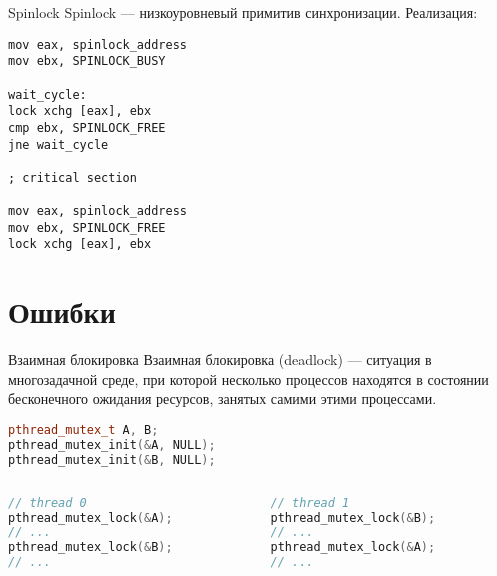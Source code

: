 \begin{frame}[fragile]{Spinlock}
Spinlock --- низкоуровневый примитив синхронизации.
\vfill
Реализация:
\begin{lstlisting}[language={[x86masm]Assembler}, basicstyle=\scriptsize]
mov eax, spinlock_address
mov ebx, SPINLOCK_BUSY

wait_cycle:
lock xchg [eax], ebx
cmp ebx, SPINLOCK_FREE
jne wait_cycle

; critical section

mov eax, spinlock_address
mov ebx, SPINLOCK_FREE
lock xchg [eax], ebx
\end{lstlisting}
\end{frame}

\section{Ошибки}

\begin{frame}[fragile]{Взаимная блокировка}
Взаимная блокировка (\abbr deadlock) --- ситуация в многозадачной среде, при которой несколько процессов находятся в состоянии бесконечного ожидания ресурсов, занятых самими этими процессами.
\vfill
\begin{lstlisting}[language=C++,basicstyle=\ttfamily,keywordstyle=\color{blue},basicstyle=\footnotesize]
pthread_mutex_t A, B;
pthread_mutex_init(&A, NULL);
pthread_mutex_init(&B, NULL);
\end{lstlisting}

\begin{columns}[t]
    \begin{column}[T]{0.45\textwidth}
        \begin{lstlisting}[language=C++,basicstyle=\ttfamily,keywordstyle=\color{blue},basicstyle=\scriptsize]
// thread 0
pthread_mutex_lock(&A);
// ...
pthread_mutex_lock(&B);
// ...
        \end{lstlisting}
    \end{column}
    \begin{column}[T]{0.45\textwidth}
        \begin{lstlisting}[language=C++,basicstyle=\ttfamily,keywordstyle=\color{blue},basicstyle=\scriptsize]
// thread 1
pthread_mutex_lock(&B);
// ...
pthread_mutex_lock(&A);
// ...
        \end{lstlisting}
    \end{column}
\end{columns}
\end{frame}

